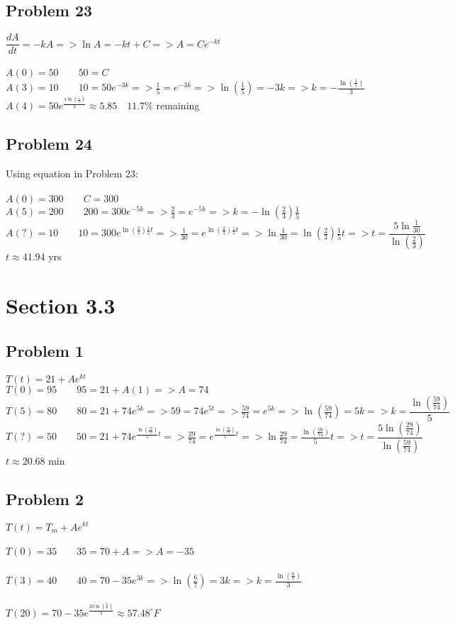 \documentclass[12pt]{exam}
\begin{document}
\subsection*{Problem 23}
$\dfrac{dA}{dt}=-kA=>\ln{A}=-kt+C=>A=Ce^{-kt}$\\\\
$A(0)=50\qquad50=C$\\
$A(3)=10\qquad10=50e^{-3k}=>\frac{1}{5}=e^{-3k}=>\ln{\left(\frac{1}{5}\right)}=-3k=>k=-\frac{\ln{\left(\frac{1}{5}\right)}}{3}$\\
$A(4)=50e^{\frac{4\ln{\left(\frac{1}{5}\right)}}{3}}\approx5.85\quad11.7\%$ remaining
\subsection*{Problem 24}
Using equation in Problem 23:\\\\
$A(0)=300\qquad C=300$\\
$A(5)=200\qquad200=300e^{-5k}=>\frac{2}{3}=e^{-5k}=>k=-\ln{\left(\frac{2}{3}\right)}\frac{1}{5}$\\
$A(?)=10\qquad10=300e^{\ln{\left(\frac{2}{3}\right)}\frac{1}{5}t}=>\frac{1}{30}=e^{\ln{\left(\frac{2}{3}\right)}\frac{1}{5}t}=>\ln{\frac{1}{30}}=\ln{\left(\frac{2}{3}\right)}\frac{1}{5}t=>t=\dfrac{5\ln{\frac{1}{30}}}{\ln{\left(\frac{2}{3}\right)}}$\\
$t\approx41.94$ yrs
\section*{Section 3.3}
\subsection*{Problem 1}
$T(t)=21+Ae^{kt}$\\
$T(0)=95\qquad95=21+A(1)=>A=74$\\
$T(5)=80\qquad80=21+74e^{5k}=>59=74e^{5t}=>\frac{59}{74}=e^{5k}=>\ln{\left(\frac{59}{74}\right)}=5k=>k=\dfrac{\ln{\left(\frac{59}{74}\right)}}{5}$\\
$T(?)=50\qquad50=21+74e^{\frac{\ln{\left(\frac{59}{74}\right)}}{5}t}=>\frac{29}{74}=e^{\frac{\ln{\left(\frac{59}{74}\right)}}{5}t}=>\ln{\frac{29}{74}}=\frac{\ln{\left(\frac{59}{74}\right)}}{5}t=>t=\dfrac{5\ln{\left(\frac{29}{74}\right)}}{\ln{\left(\frac{59}{74}\right)}}$\\
$t\approx20.68$ min
\subsection*{Problem 2}
$T(t)=T_m+Ae^{kt}$\\\\
$T(0)=35\qquad35=70+A=>A=-35$\\\\
$T(3)=40\qquad40=70-35e^{3k}=>\ln{\left(\frac{6}{7}\right)}=3k=>k=\frac{\ln{\left(\frac{6}{7}\right)}}{3}$\\\\
$T(20)=70-35e^{\frac{20\ln{\left(\frac{6}{7}\right)}}{3}}\approx57.48^\circ F$
\end{document}
